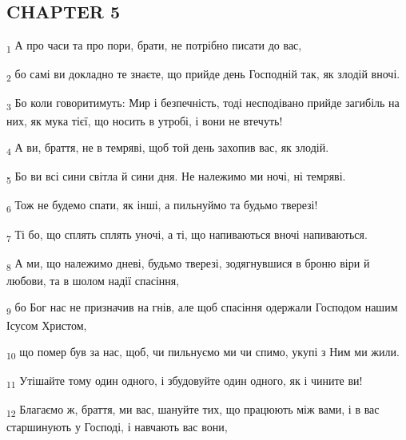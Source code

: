 \subsection{CHAPTER 5}
\begin{tcolorbox}
\textsubscript{1} А про часи та про пори, брати, не потрібно писати до вас,
\end{tcolorbox}
\begin{tcolorbox}
\textsubscript{2} бо самі ви докладно те знаєте, що прийде день Господній так, як злодій вночі.
\end{tcolorbox}
\begin{tcolorbox}
\textsubscript{3} Бо коли говоритимуть: Мир і безпечність, тоді несподівано прийде загибіль на них, як мука тієї, що носить в утробі, і вони не втечуть!
\end{tcolorbox}
\begin{tcolorbox}
\textsubscript{4} А ви, браття, не в темряві, щоб той день захопив вас, як злодій.
\end{tcolorbox}
\begin{tcolorbox}
\textsubscript{5} Бо ви всі сини світла й сини дня. Не належимо ми ночі, ні темряві.
\end{tcolorbox}
\begin{tcolorbox}
\textsubscript{6} Тож не будемо спати, як інші, а пильнуймо та будьмо тверезі!
\end{tcolorbox}
\begin{tcolorbox}
\textsubscript{7} Ті бо, що сплять сплять уночі, а ті, що напиваються вночі напиваються.
\end{tcolorbox}
\begin{tcolorbox}
\textsubscript{8} А ми, що належимо дневі, будьмо тверезі, зодягнувшися в броню віри й любови, та в шолом надії спасіння,
\end{tcolorbox}
\begin{tcolorbox}
\textsubscript{9} бо Бог нас не призначив на гнів, але щоб спасіння одержали Господом нашим Ісусом Христом,
\end{tcolorbox}
\begin{tcolorbox}
\textsubscript{10} що помер був за нас, щоб, чи пильнуємо ми чи спимо, укупі з Ним ми жили.
\end{tcolorbox}
\begin{tcolorbox}
\textsubscript{11} Утішайте тому один одного, і збудовуйте один одного, як і чините ви!
\end{tcolorbox}
\begin{tcolorbox}
\textsubscript{12} Благаємо ж, браття, ми вас, шануйте тих, що працюють між вами, і в вас старшинують у Господі, і навчають вас вони,
\end{tcolorbox}
